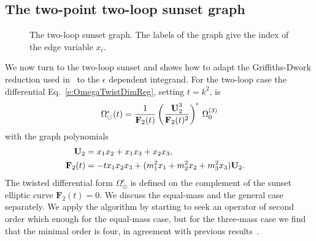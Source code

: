 \documentclass[a4paper,12pt]{article}
\numberwithin{equation}{section}
\numberwithin{figure}{section}
\def\su{\circleddash}
\begin{document}
\subsection{The two-point  two-loop sunset graph}
\label{sec:two-loop-case}
	\begin{figure}[ht]
		\centering
		\caption{The two-loop sunset graph.  The
          labels of the graph give the index of the edge variable $x_i$.}
		  \label{fig:sunset2loop}
	\end{figure}
%
We now turn to the two-loop sunset and shows how to adapt the
Griffiths-Dwork reduction used in~\cite{Bloch:2016izu,Lairez:2022zkj} to the $\epsilon$
dependent integrand. For the two-loop case the differential
Eq.~\eqref{e:OmegaTwistDimReg}, setting $t=k^2$, is
\begin{equation}\label{e:OmegaSunset}
  \Omega_{\su}^{\epsilon}(t)={1\over
    \textbf{F}_2(t)}\left(\textbf{U}_2^3\over \textbf{F}_2(t)^2\right)^\epsilon  \,\Omega_0^{(3)}
\end{equation}
with the graph polynomials 
\begin{align}
 \textbf{U}_2&=x_1x_2+x_1x_3+x_2x_3,\cr
  \textbf{F}_2(t)&=-t x_1x_2x_3 + (m_1^2x_1+m_2^2x_2+m_3^2x_3) \textbf{U}_2.
\end{align}
%
The twisted differential form $\Omega_\su^{\epsilon}$ is defined on the
complement of the sunset elliptic curve $\mathbf{F}_2(t)=0$.
%
We discuss the equal-mass and the general case separately.
%
We apply the algorithm by starting to seek an operator of second order which enough for the equal-mass case, but for the
three-mass case we find that the minimal order is four, in
agreement with previous results~\cite{Caffo:1998du,Remiddi:2013joa,Adams:2013nia}.

\end{document}
